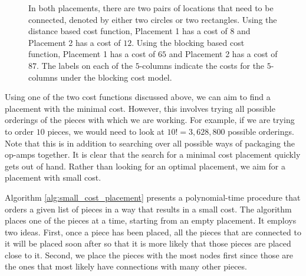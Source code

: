 \begin{figure}
\centering
{}
\caption[Placement cost function examples]{In both placements, there are two
pairs of locations that need to be connected, denoted by either two circles or
two rectangles. Using the distance based cost function, Placement 1 has a cost of
$8$ and Placement 2 has a cost of $12$. Using the blocking based cost function,
Placement 1 has a cost of $65$ and Placement 2 has a cost of $87$. The labels
on each of the $5$-columns indicate the costs for the $5$-columns under the
blocking cost model.}
\label{fig:placement_costs}
\end{figure}

Using one of the two cost functions discussed above, we can aim to find a
placement with the minimal cost. However, this involves trying all possible
orderings of the pieces with which we are working. For example, if we are trying
to order $10$ pieces, we would need to look at $10! = 3,628,800$ possible
orderings. Note that this is in addition to
searching over all possible ways
of packaging the op-amps together. It is clear that the search for a
minimal cost placement quickly gets out of hand.
Rather than looking for an optimal placement, we aim for a placement with small
cost.

Algorithm \ref{alg:small_cost_placement} presents a polynomial-time procedure
that orders a
given list of pieces in a way that results in a small cost. The algorithm places
one of the pieces at a time, starting from an empty placement. It employs
two ideas. First, once a piece has been placed, all the pieces that are
connected to it will be placed soon after so that it is more likely that those
pieces are placed close to it. Second, we place the pieces with the most nodes
first since those are the ones that most likely have connections with many other
pieces.

